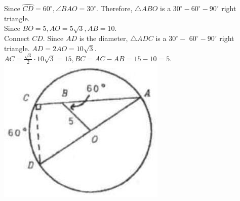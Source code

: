 \documentclass{article}
\begin{document}
Since \(\wideparen{C D}=60^{\circ}, \angle B A O=30^{\circ}\). Therefore, \(\triangle A B O\) is a \(30^{\circ}-60^{\circ}-90^{\circ}\) right triangle.\\
Since \(B O=5, A O=5 \sqrt{3}, A B=10\).\\
Connect \(C D\). Since \(A D\) is the diameter, \(\triangle A D C\) is a \(30^{\circ}-\) \(60^{\circ}-90^{\circ}\) right triangle. \(A D=2 A O=10 \sqrt{3}\).\\
\(A C=\frac{\sqrt{3}}{2} \cdot 10 \sqrt{3}=15, B C=A C-A B=15-10=5\).\\
\centering
\includegraphics[width=\textwidth]{images/166(2).jpg}
\end{document}
